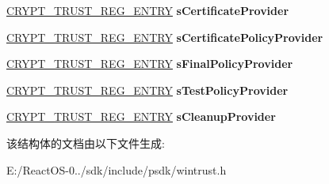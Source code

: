 \begin{DoxyCompactItemize}
\hyperlink{struct___c_r_y_p_t___t_r_u_s_t___r_e_g___e_n_t_r_y}{C\+R\+Y\+P\+T\+\_\+\+T\+R\+U\+S\+T\+\_\+\+R\+E\+G\+\_\+\+E\+N\+T\+RY} {\bfseries s\+Certificate\+Provider}
\item 
\mbox{\label{struct___c_r_y_p_t___r_e_g_i_s_t_e_r___a_c_t_i_o_n_i_d_a7a8508d2d750079a3caf029218c900c8}} 
\hyperlink{struct___c_r_y_p_t___t_r_u_s_t___r_e_g___e_n_t_r_y}{C\+R\+Y\+P\+T\+\_\+\+T\+R\+U\+S\+T\+\_\+\+R\+E\+G\+\_\+\+E\+N\+T\+RY} {\bfseries s\+Certificate\+Policy\+Provider}
\item 
\mbox{\label{struct___c_r_y_p_t___r_e_g_i_s_t_e_r___a_c_t_i_o_n_i_d_a8e7d42c525a93165cb432411eea2e364}} 
\hyperlink{struct___c_r_y_p_t___t_r_u_s_t___r_e_g___e_n_t_r_y}{C\+R\+Y\+P\+T\+\_\+\+T\+R\+U\+S\+T\+\_\+\+R\+E\+G\+\_\+\+E\+N\+T\+RY} {\bfseries s\+Final\+Policy\+Provider}
\item 
\mbox{\label{struct___c_r_y_p_t___r_e_g_i_s_t_e_r___a_c_t_i_o_n_i_d_a472cfeabe59e3f3551e76fa6d9991035}} 
\hyperlink{struct___c_r_y_p_t___t_r_u_s_t___r_e_g___e_n_t_r_y}{C\+R\+Y\+P\+T\+\_\+\+T\+R\+U\+S\+T\+\_\+\+R\+E\+G\+\_\+\+E\+N\+T\+RY} {\bfseries s\+Test\+Policy\+Provider}
\item 
\mbox{\label{struct___c_r_y_p_t___r_e_g_i_s_t_e_r___a_c_t_i_o_n_i_d_aa467c82b5a66cc8b64eadadb0928c2db}} 
\hyperlink{struct___c_r_y_p_t___t_r_u_s_t___r_e_g___e_n_t_r_y}{C\+R\+Y\+P\+T\+\_\+\+T\+R\+U\+S\+T\+\_\+\+R\+E\+G\+\_\+\+E\+N\+T\+RY} {\bfseries s\+Cleanup\+Provider}
\end{DoxyCompactItemize}


该结构体的文档由以下文件生成\+:\begin{DoxyCompactItemize}
\item 
E\+:/\+React\+O\+S-\/0../sdk/include/psdk/wintrust.\+h\end{DoxyCompactItemize}

